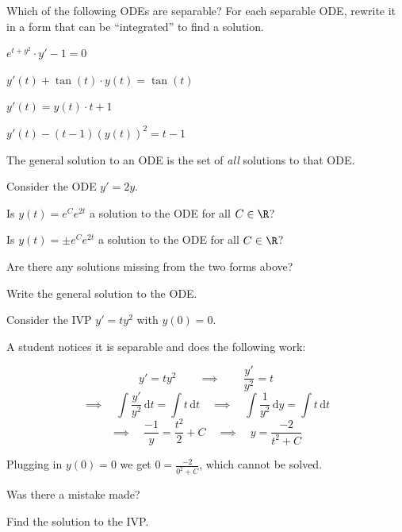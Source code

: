 \documentclass{workbook}
\begin{document}
\begin{slide}
	\question
	Which of the following ODEs are separable? For each separable ODE,
	rewrite it in a form that can be ``integrated'' to find a solution.

	\begin{parts}  
		\item $e^{t+y^2}\cdot y'-1=0$
		\item $y'(t)+\tan(t)\cdot y(t)=\tan(t)$
		\item $y'(t)=y(t)\cdot t +1$
		\item $y'(t)-(t-1)(y(t))^2=t-1$
	\end{parts}
\end{slide}

\begin{slide}
	\question
	\begin{definition}
		The general solution to an ODE is the set of \emph{all} solutions to 
		that ODE.
	\end{definition}

	Consider the ODE $y'=2y$.

	\begin{parts}  
		\item Is $y(t)=e^Ce^{2t}$ a solution to the ODE for all $C\in \R$?
		\item Is $y(t)=\pm e^Ce^{2t}$ a solution to the ODE for all $C\in \R$?
		\item Are there any solutions missing from the two forms above?
		\item Write the general solution to the ODE.
	\end{parts}
\end{slide}

\begin{slide}
	\question
	Consider the IVP $y'=ty^2$ with $y(0)=0$.


	\begin{minipage}{0.45\textwidth}

	A student notices it is separable and does the following work:

	\[
	y'=ty^2 \qquad\implies \qquad \frac{y'}{y^2}=t
	\]
	\[
	\implies \quad \int \frac{y'}{y^2}\,\mathrm d t = \int t\,\mathrm d t 
	\quad
	\implies
	\quad \int \frac{1}{y^2}\,\mathrm d y = \int t\,\mathrm d t 
	\]
	\[
	\implies\quad  \frac{-1}{y}=\frac{t^2}{2} + C \quad \implies \quad 
	y=\frac{-2}{t^2+C}
	\]

	Plugging in $y(0)=0$ we get $0=\frac{-2}{0^2+C}$, which cannot be solved.
	\end{minipage}

	\begin{parts}  
		\item Was there a mistake made?
		\item Find the solution to the IVP.
	\end{parts}
\end{slide}
\end{document}
